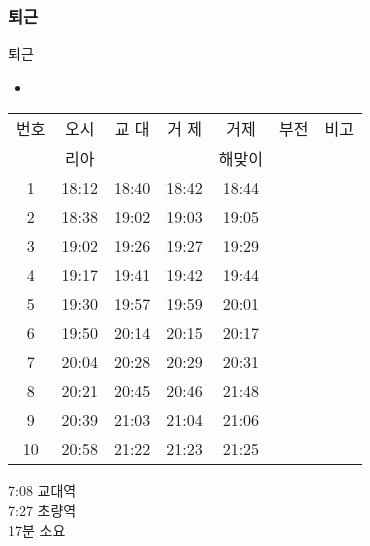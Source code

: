 \documentclass[aspectratio=1610,20pt,xcolor=pdftex,dvipsnames,table,handout]{beamer}
\begin{document}
		\begin{frame} [t,plain]
		\frametitle{퇴근}

			\begin{block} {퇴근}
			\setlength{\leftmargini}{2em}			
			\begin{itemize}
				\item 
			\end{itemize}
			\end{block}						

		   \begin{center}
			\label{table:second}
			\setlength{\tabcolsep}{2pt}
			\small
		     	\begin{tabular}{ c |c|c|c|c|c|c} \hline
				번호  	& 오시		& 	교 대  	& 거 제 			& 거제 		&부전	& 비고 \\ 
					  	& 리아		& 	  		&  				& 해맞이 	&		\\ \hline \hline
																						
				1  		& 	18:12	&	18:40	&	18:42		&	18:44		&  \\ \hline
				2  		& 	18:38	&	19:02	&	19:03		&	19:05		&  \\ \hline
				3  		& 	19:02	&	19:26	&	19:27		&	19:29		&  \\ \hline
				4  		& 	19:17	&	19:41	&	19:42		&	19:44		&  \\ \hline
				5  		& 	19:30	&	19:57	&	19:59		&	20:01		&  \\ \hline
				6  		& 	19:50	&	20:14	&	20:15		&	20:17		&  \\ \hline
				7  		& 	20:04	&	20:28	&	20:29		&	20:31		&  \\ \hline
				8  		& 	20:21	&	20:45	&	20:46		&	21:48		&  \\ \hline
				9  		& 	20:39	&	21:03	&	21:04		&	21:06		&  \\ \hline
				10  		& 	20:58	&	21:22	&	21:23		&	21:25		&  \\ \hline
			\end{tabular}
			\end{center}%

				7:08 교대역 \hrulefill \\

				7:27 초량역 \hrulefill \\
				17분 소요 \hrulefill \\



		\end{frame}						
\end{document}
